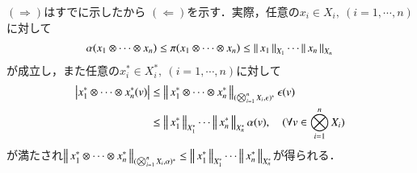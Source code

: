 	\begin{prf}
		$(\Rightarrow)$はすでに示したから
		$(\Leftarrow)$を示す．実際，任意の$x_i \in X_i,\ (i=1,\cdots,n)$に対して
		\begin{align}
			\alpha(x_1 \otimes \cdots \otimes x_n) 
			\leq \pi(x_1 \otimes \cdots \otimes x_n) 
			\leq \left\|\, x_1\, \right\|_{X_1} \cdots \left\|\, x_n\, \right\|_{X_n}
		\end{align}
		が成立し，また任意の$x_i^* \in X_i^*,\ (i=1,\cdots,n)$に対して
		\begin{align}
			\left| x_1^* \otimes \cdots \otimes x_n^*(v) \right|
			&\leq \left\|\, x_1^* \otimes \cdots \otimes x_n^*\, \right\|_{(\bigotimes_{i=1}^n X_i, \epsilon)^*} \epsilon(v) \\
			&\leq \left\|\, x_1^*\, \right\|_{X_1^*} \cdots \left\|\, x_n^*\, \right\|_{X_n^*} \alpha(v),
			\quad (\forall v \in \bigotimes_{i=1}^n X_i)
		\end{align}
		が満たされ$\left\|\, x_1^* \otimes \cdots \otimes x_n^*\, \right\|_{(\bigotimes_{i=1}^n X_i, \alpha)^*} 
		\leq \left\|\, x_1^*\, \right\|_{X_1^*} \cdots \left\|\, x_n^*\, \right\|_{X_n^*}$が得られる．
		\QED
	\end{prf}